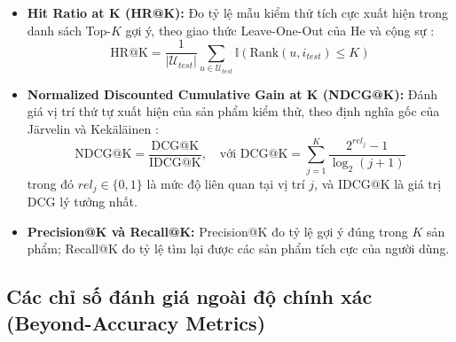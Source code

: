 \begin{itemize}
    \item \textbf{Hit Ratio at K (HR@K):} Đo tỷ lệ mẫu kiểm thử tích cực xuất hiện trong danh sách Top-$K$ gợi ý, theo giao thức Leave-One-Out của He và cộng sự \parencite{he2017ncf}:
    \begin{equation}
        \text{HR@K} = \frac{1}{|\mathcal{U}_{test}|} \sum_{u \in \mathcal{U}_{test}} \mathbb{I}\left( \text{Rank}(u, i_{test}) \le K \right)
        \label{eq:hr_k}
    \end{equation}

    \item \textbf{Normalized Discounted Cumulative Gain at K (NDCG@K):} Đánh giá vị trí thứ tự xuất hiện của sản phẩm kiểm thử, theo định nghĩa gốc của Järvelin và Kekäläinen \parencite{jarvelin2002}:
    \begin{equation}
        \text{NDCG@K} = \frac{\text{DCG@K}}{\text{IDCG@K}}, \quad \text{với } \text{DCG@K} = \sum_{j=1}^{K} \frac{2^{rel_j} - 1}{\log_2(j + 1)}
        \label{eq:ndcg_k}
    \end{equation}
    trong đó $rel_j \in \{0, 1\}$ là mức độ liên quan tại vị trí $j$, và $\text{IDCG@K}$ là giá trị DCG lý tưởng nhất.

    \item \textbf{Precision@K và Recall@K:} Precision@K đo tỷ lệ gợi ý đúng trong $K$ sản phẩm; Recall@K đo tỷ lệ tìm lại được các sản phẩm tích cực của người dùng.
\end{itemize}

\subsection{Các chỉ số đánh giá ngoài độ chính xác (Beyond-Accuracy Metrics)}
\label{subsec:beyond_accuracy}

